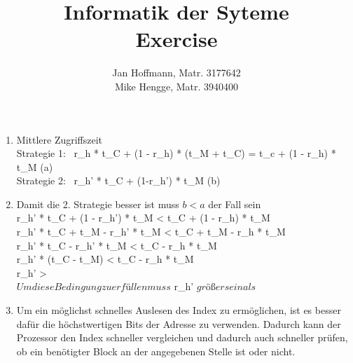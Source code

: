 \documentclass[10pt,a4paper,landscape]{article}
\title{Informatik der Syteme \\ Exercise \exnum}
\author{Jan Hoffmann, Matr. 3177642 \\ Mike Hengge,  Matr. 3940400}
\begin{document}
\section{}\label{sec:10.1}
	\begin{enumerate}
		\item Mittlere Zugriffszeit \\
					Strategie 1: \ r_h * t_C + (1 - r_h) * (t_M + t_C) = t_c + (1 - r_h) * t_M \Rightarrow    (a) \\
					Strategie 2: \ r_h' * t_C + (1-r_h') * t_M \Rightarrow (b) 
		
		\item Damit die 2. Strategie besser ist muss $b < a$ der Fall sein\\
					\Rightarrow r_h' * t_C + (1 - r_h') * t_M < t_C + (1 - r_h) * t_M \\
					\Rightarrow r_h' * t_C + t_M - r_h' * t_M < t_C + t_M - r_h * t_M \\
					\Rightarrow r_h' * t_C - r_h' * t_M < t_C - r_h * t_M \\
					\Rightarrow r_h' * (t_C - t_M) < t_C - r_h * t_M \\
					\Rightarrow r_h' >  \\ 
					\Rightarrow $Um diese Bedingung zu erfüllen muss $ r_h' $ größer sein als $ 
					
		\item Um ein möglichst schnelles Auslesen des Index zu ermöglichen, ist es besser dafür die höchstwertigen Bits der Adresse zu verwenden. Dadurch kann der Prozessor den Index schneller vergleichen und dadurch auch schneller prüfen, ob ein benötigter Block an der angegebenen Stelle ist oder nicht.
		
											
	\end{enumerate}
\end{document}
